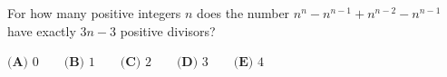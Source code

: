 For how many positive integers $n$ does the number $n^{n}-n^{n-1}+n^{n-2}-n^{n-1}$ have exactly $3n-3$ positive divisors?

$\textbf{(A) }0\qquad\textbf{(B) }1\qquad\textbf{(C) }2\qquad\textbf{(D) }3\qquad\textbf{(E) }4$
